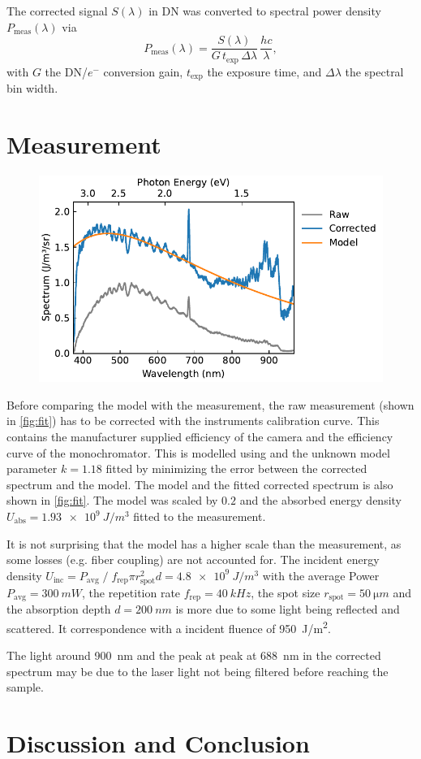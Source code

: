 \documentclass[
	parskip=half,
	a4paper,
]{scrarticle}
\begin{document}
The corrected signal \(S(\lambda)\) in DN was converted to spectral power density \(P_{\text{meas}}(\lambda)\) via
\begin{equation}
  P_{\text{meas}}(\lambda)
  = \frac{S(\lambda)}{G\,t_{\text{exp}}\,\Delta\lambda}\,\frac{hc}{\lambda},
\end{equation}
with \(G\) the DN/\(e^-\) conversion gain, \(t_{\text{exp}}\) the exposure time, and \(\Delta\lambda\) the spectral bin width.  

\clearpage
\section{Measurement}
\begin{figure}[h]
    \centering
    \includegraphics{../analysis/figures/combined.fit.pdf}
    \caption{}
    \label{fig:fit}
\end{figure}
Before comparing the model with the measurement, the raw measurement (shown in \autoref{fig:fit}) has to be corrected with the instruments calibration curve.
This contains the manufacturer supplied efficiency of the camera \cite{andorIXonEM897Manual} and the efficiency curve of the monochromator.
This is modelled using \autocite{barkerRippleCorrectionHighdispersion1984} and the unknown model parameter $k=1.18$ fitted by minimizing the error between the corrected spectrum and the model.
The model and the fitted corrected spectrum is also shown in \autoref{fig:fit}.
The model was scaled by $0.2$ and the absorbed energy density $U_\text{abs} = \SI{1.93e9}{J/m^3}$ fitted to the measurement.

It is not surprising that the model has a higher scale than the measurement, as some losses (e.g. fiber coupling) are not accounted for.
The incident energy density $U_\text{inc} = P_\text{avg} \; / \; f_\text{rep} \pi r_\text{spot}^2 d = \SI{4.8e9}{J/m^3}$ with the average Power $P_\text{avg}=\SI{300}{mW}$, the repetition rate $f_\text{rep}=\SI{40}{kHz}$, the spot size $r_\text{spot}=\SI{50}{\micro m}$ and the absorption depth $d=\SI{200}{nm}$ \cite{smauszDeterminationUVVisible2017} is more due to some light being reflected and scattered. It correspondence with a incident fluence of \SI{950}{J/m^2}. 

The light around \SI{900}{nm} and the peak at peak at \SI{688}{nm} in the corrected spectrum may be due to the laser light not being filtered before reaching the sample.

\section{Discussion and Conclusion}

\clearpage
\printbibliography
\end{document}
